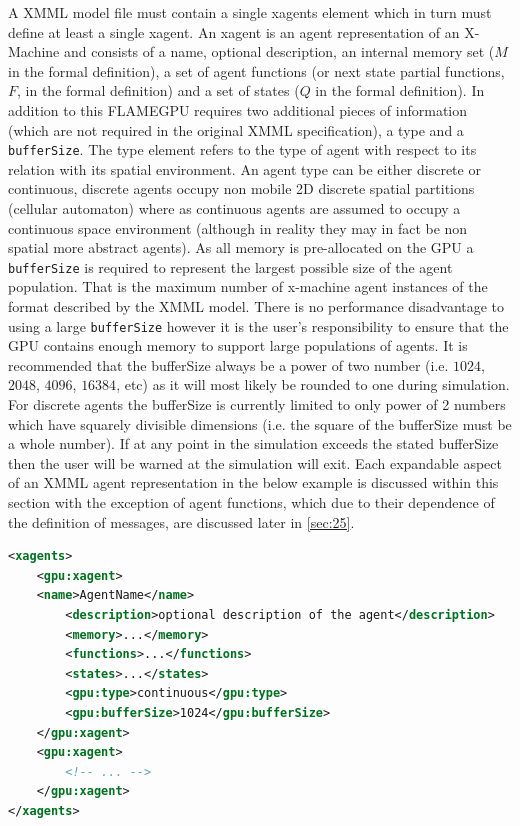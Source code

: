 \documentclass[11pt, a4paper, onecolumn, oneside]{report}
\begin{document}
A XMML model file must contain a single xagents element which in turn must define at least a single xagent.
An xagent is an agent representation of an X-Machine and consists of a name, optional description, an internal memory set ($M$ in the formal definition), a set of agent functions (or next state partial functions, $F$, in the formal definition) and a set of states ($Q$ in the formal definition).
In addition to this FLAMEGPU requires two additional pieces of information (which are not required in the original XMML specification), a type and a \texttt{bufferSize}.
The type element refers to the type of agent with respect to its relation with its spatial environment.
An agent type can be either discrete or continuous, discrete agents occupy non mobile 2D discrete spatial partitions (cellular automaton) where as continuous agents are assumed to occupy a continuous space environment (although in reality they may in fact be non spatial more abstract agents).
As all memory is pre-allocated on the GPU a \texttt{bufferSize} is required to represent the largest possible size of the agent population.
That is the maximum number of x-machine agent instances of the format described by the XMML model.
There is no performance disadvantage to using a large \texttt{bufferSize} however it is the user's responsibility to ensure that the GPU contains enough memory to support large populations of agents.
It is recommended that the bufferSize always be a power of two number (i.e.
$1024$, $2048$, $4096$, $16384$, etc) as it will most likely be rounded to one during simulation.
For discrete agents the bufferSize is currently limited to only power of 2 numbers which have squarely divisible dimensions (i.e. the square of the bufferSize must be a whole number).
If at any point in the simulation exceeds the stated bufferSize then the user will be warned at the simulation will exit.
Each expandable aspect of an XMML agent representation in the below example is discussed within this section with the exception of agent functions, which due to their dependence of the definition of messages, are discussed later in \cref{sec:25}.

\begin{lstlisting}[language=XML]
<xagents>
    <gpu:xagent>
    <name>AgentName</name>
        <description>optional description of the agent</description>
        <memory>...</memory>
        <functions>...</functions>
        <states>...</states>
        <gpu:type>continuous</gpu:type>
        <gpu:bufferSize>1024</gpu:bufferSize>
    </gpu:xagent>
    <gpu:xagent>
        <!-- ... -->
    </gpu:xagent>
</xagents>
\end{lstlisting}
\end{document}
